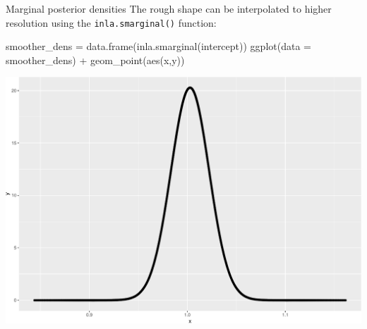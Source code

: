 \documentclass[
  ignorenonframetext,
]{beamer}
\newenvironment{Shaded}{\begin{snugshade}}{\end{snugshade}}
\newcommand{\AttributeTok}[1]{\textcolor[rgb]{0.77,0.63,0.00}{#1}}
\newcommand{\FunctionTok}[1]{\textcolor[rgb]{0.00,0.00,0.00}{#1}}
\newcommand{\NormalTok}[1]{#1}
\newcommand{\OtherTok}[1]{\textcolor[rgb]{0.56,0.35,0.01}{#1}}
\newcommand{\SpecialCharTok}[1]{\textcolor[rgb]{0.00,0.00,0.00}{#1}}
\begin{document}
\begin{frame}[fragile]{Marginal posterior densities}
\protect\hypertarget{marginal-posterior-densities-1}{}
The rough shape can be interpolated to higher resolution using the
\texttt{inla.smarginal()} function:

\begin{Shaded}
\begin{Highlighting}[]
\NormalTok{smoother\_dens }\OtherTok{=} \FunctionTok{data.frame}\NormalTok{(}\FunctionTok{inla.smarginal}\NormalTok{(intercept))}
\FunctionTok{ggplot}\NormalTok{(}\AttributeTok{data =}\NormalTok{ smoother\_dens) }\SpecialCharTok{+} \FunctionTok{geom\_point}\NormalTok{(}\FunctionTok{aes}\NormalTok{(x,y))}
\end{Highlighting}
\end{Shaded}

\begin{center}\includegraphics[width=0.6\linewidth]{Part2_RINLA_files/figure-beamer/unnamed-chunk-26-1} \end{center}
\end{frame}
\end{document}
